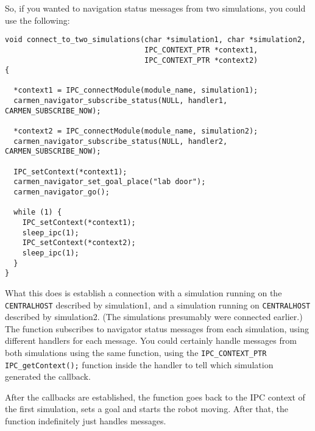 \documentclass{article}
\begin{document}
\begin{enumerate}
So, if you wanted to navigation status messages from two simulations, you
could use the following:
\begin{verbatim}
void connect_to_two_simulations(char *simulation1, char *simulation2,
                                IPC_CONTEXT_PTR *context1,
                                IPC_CONTEXT_PTR *context2) 
{

  *context1 = IPC_connectModule(module_name, simulation1);
  carmen_navigator_subscribe_status(NULL, handler1, CARMEN_SUBSCRIBE_NOW);

  *context2 = IPC_connectModule(module_name, simulation2);
  carmen_navigator_subscribe_status(NULL, handler2, CARMEN_SUBSCRIBE_NOW);

  IPC_setContext(*context1);
  carmen_navigator_set_goal_place("lab door");
  carmen_navigator_go();

  while (1) {
    IPC_setContext(*context1);
    sleep_ipc(1);
    IPC_setContext(*context2);
    sleep_ipc(1);
  } 
}
\end{verbatim} 

What this does is establish a connection with a simulation running on the
\verb!CENTRALHOST! described by simulation1, and a simulation running on
\verb!CENTRALHOST! described by simulation2. (The simulations presumably were
connected earlier.) The function subscribes to navigator status messages from
each simulation, using different handlers for each message. You could
certainly handle messages from both simulations using the same function, using
the \verb!IPC_CONTEXT_PTR IPC_getContext();! function inside the handler to
tell which simulation generated the callback. 

After the callbacks are established, the function goes back to the IPC context
of the first simulation, sets a goal and starts the robot moving. After that,
the function indefinitely just handles messages.

\end{enumerate}
\end{document}
